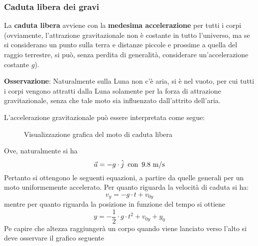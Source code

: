 \documentclass[a4paper]{extarticle}
\begin{document}
\vspace{1em}
\subsubsection{Caduta libera dei gravi}
La \textbf{caduta libera} avviene con la \textbf{medesima accelerazione} per tutti i corpi (ovviamente, l'attrazione gravitazionale non è costante in tutto l'universo, ma se si considerano un punto sulla terra e distanze piccole e prossime a quella del raggio terrestre, si può, senza perdita di generalità, considerare un'accelerazione costante $g$).

\vspace{1em}
\noindent
\textbf{Osservazione}: Naturalmente sulla Luna non c'è aria, si è nel vuoto, per cui tutti i corpi vengono attratti dalla Luna solamente per la forza di attrazione gravitazionale, senza che tale moto sia influenzato dall'attrito dell'aria.

\vspace{1em}
\noindent
L'accelerazione gravitazionale può essere interpretata come segue:

\begin{figure}[H]
  \centering
  \caption{Visualizzazione grafica del moto di caduta libera}
  \label{fig:visualizzazione_grafica_caduta_libera}
\end{figure}


\vspace{1em}
\noindent
Ove, naturalmente si ha
\[\vec{a} = -g \cdot \hat{j} \hspace{0.5em} \text{con} \hspace{0.5em} 9.8 \text{ m/s}\]
Pertanto si ottengono le seguenti equazioni, a partire da quelle generali per un moto uniformemente accelerato. Per quanto riguarda la velocità di caduta si ha:
\[\boxed{v_y = -g \cdot t + v_{0y}}\]
mentre per quanto riguarda la posizione in funzione del tempo si ottiene
\[\boxed{y = - \frac{1}{2} \cdot g \cdot t^2 + v_{0y} + y_0}\]
Pe capire che altezza raggiungerà un corpo quando viene lanciato verso l'alto si deve osservare il grafico seguente
\end{document}
